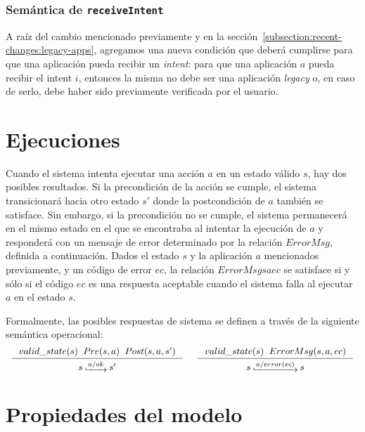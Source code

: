 \subsubsection{Semántica de \texttt{receiveIntent}}

A raíz del cambio mencionado previamente y en la sección~\ref{subsection:recent-changes:legacy-apps},
agregamos una nueva condición que deberá cumplirse para que una aplicación pueda recibir un
\textit{intent}: para que una aplicación $a$ pueda recibir el intent $i$, entonces la misma no debe
ser una aplicación \textit{legacy} o, en caso de serlo, debe haber sido previamente verificada por el
usuario.



\section{Ejecuciones}
Cuando el sistema intenta ejecutar una acción $a$ en un estado válido $s$, hay dos posibles
resultados. Si la precondición de la acción se cumple, el sistema transicionará hacia otro estado $s'$
donde la postcondición de $a$ también se satisface. Sin embargo, si la precondición no se cumple, el
sistema permanecerá en el mismo estado en el que se encontraba al intentar la ejecución de $a$ y
responderá con un mensaje de error determinado por la relación $ErrorMsg$, definida a continuación.
Dados el estado $s$ y la aplicación $a$ mencionados previamente, y un código de error $ec$, la
relación $ErrorMsg s a ec$ se satisface si y sólo si el código $ec$ es una respuesta aceptable cuando
el sistema falla al ejecutar $a$ en el estado $s$.

Formalmente, las posibles respuestas de sistema se definen a través de la siguiente semántica operacional:
\begin{displaymath}
\begin{array}{c}
\inference[]{$$valid\_state(s)$$ \hspace{.2cm} $$Pre(s, a)$$ \hspace{.2cm} $$Post(s, a, s')$$}{$$s\step{a/ok}s'$$}
\hspace{0.5cm}
\inference[]{$$valid\_state(s)$$ \hspace{.2cm} $$ErrorMsg(s, a, ec)$$}{$$s\step{a/error(ec)}s$$}
\end{array}
\end{displaymath}

\section{Propiedades del modelo}

